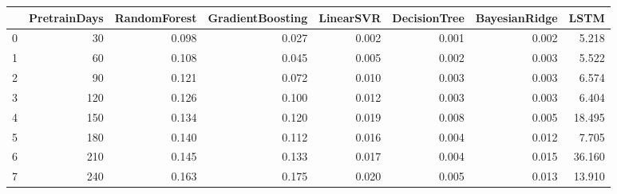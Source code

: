 \begin{tabular}{lrrrrrrr}
\toprule
{} &  PretrainDays &  RandomForest &  GradientBoosting &  LinearSVR &  DecisionTree &  BayesianRidge &   LSTM \\
\midrule
0 &            30 &         0.098 &             0.027 &      0.002 &         0.001 &          0.002 &  5.218 \\
1 &            60 &         0.108 &             0.045 &      0.005 &         0.002 &          0.003 &  5.522 \\
2 &            90 &         0.121 &             0.072 &      0.010 &         0.003 &          0.003 &  6.574 \\
3 &           120 &         0.126 &             0.100 &      0.012 &         0.003 &          0.003 &  6.404 \\
4 &           150 &         0.134 &             0.120 &      0.019 &         0.008 &          0.005 & 18.495 \\
5 &           180 &         0.140 &             0.112 &      0.016 &         0.004 &          0.012 &  7.705 \\
6 &           210 &         0.145 &             0.133 &      0.017 &         0.004 &          0.015 & 36.160 \\
7 &           240 &         0.163 &             0.175 &      0.020 &         0.005 &          0.013 & 13.910 \\
\bottomrule
\end{tabular}

